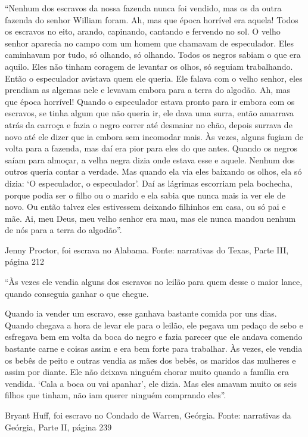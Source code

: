``Nenhum dos escravos da nossa fazenda nunca foi vendido, mas os da
outra fazenda do senhor William foram. Ah, mas que época horrível era
aquela! Todos os escravos no eito, arando, capinando, cantando e
fervendo no sol. O velho senhor aparecia no campo com um homem que
chamavam de especulador. Eles caminhavam por tudo, só olhando, só
olhando. Todos os negros sabiam o que era aquilo. Eles não tinham
coragem de levantar os olhos, só seguiam trabalhando. Então o
especulador avistava quem ele queria. Ele falava com o velho senhor,
eles prendiam as algemas nele e levavam embora para a terra do algodão.
Ah, mas que época horrível! Quando o especulador estava pronto para ir
embora com os escravos, se tinha algum que não queria ir, ele dava uma
surra, então amarrava atrás da carroça e fazia o negro correr até
desmaiar no chão, depois surrava de novo até ele dizer que ia embora sem
incomodar mais. Às vezes, alguns fugiam de volta para a fazenda, mas daí
era pior para eles do que antes. Quando os negros saíam para almoçar, a
velha negra dizia onde estava esse e aquele. Nenhum dos outros queria
contar a verdade. Mas quando ela via eles baixando os olhos, ela só
dizia: `O especulador, o especulador'. Daí as lágrimas escorriam pela
bochecha, porque podia ser o filho ou o marido e ela sabia que nunca
mais ia ver ele de novo. Ou então talvez eles estivessem deixando
filhinhos em casa, ou só pai e mãe. Ai, meu Deus, meu velho senhor era
mau, mas ele nunca mandou nenhum de nós para a terra do algodão''.

Jenny Proctor, foi escrava no Alabama. Fonte: narrativas do Texas, Parte
III, página 212

``Às vezes ele vendia alguns dos escravos no leilão para quem desse o
maior lance, quando conseguia ganhar o que chegue.

Quando ia vender um escravo, esse ganhava bastante comida por uns dias.
Quando chegava a hora de levar ele para o leilão, ele pegava um pedaço
de sebo e esfregava bem em volta da boca do negro e fazia parecer que
ele andava comendo bastante carne e coisas assim e era bem forte para
trabalhar. Às vezes, ele vendia os bebês de peito e outras vendia as
mães dos bebês, os maridos das mulheres e assim por diante. Ele não
deixava ninguém chorar muito quando a família era vendida. `Cala a boca
ou vai apanhar', ele dizia. Mas eles amavam muito os seis filhos que
tinham, não iam querer ninguém comprando eles''.

Bryant Huff, foi escravo no Condado de Warren, Geórgia. Fonte:
narrativas da Geórgia, Parte II, página 239

